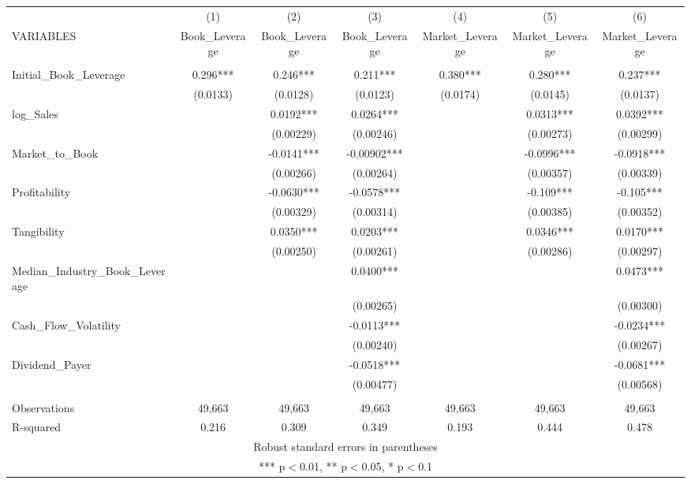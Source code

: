 \begin{tabular}{lcccccc} \hline
 & (1) & (2) & (3) & (4) & (5) & (6) \\
VARIABLES & Book\_Leverage & Book\_Leverage & Book\_Leverage & Market\_Leverage & Market\_Leverage & Market\_Leverage \\ \hline
 &  &  &  &  &  &  \\
Initial\_Book\_Leverage & 0.296*** & 0.246*** & 0.211*** & 0.380*** & 0.280*** & 0.237*** \\
 & (0.0133) & (0.0128) & (0.0123) & (0.0174) & (0.0145) & (0.0137) \\
log\_Sales &  & 0.0192*** & 0.0264*** &  & 0.0313*** & 0.0392*** \\
 &  & (0.00229) & (0.00246) &  & (0.00273) & (0.00299) \\
Market\_to\_Book &  & -0.0141*** & -0.00902*** &  & -0.0996*** & -0.0918*** \\
 &  & (0.00266) & (0.00264) &  & (0.00357) & (0.00339) \\
Profitability &  & -0.0630*** & -0.0578*** &  & -0.109*** & -0.105*** \\
 &  & (0.00329) & (0.00314) &  & (0.00385) & (0.00352) \\
Tangibility &  & 0.0350*** & 0.0203*** &  & 0.0346*** & 0.0170*** \\
 &  & (0.00250) & (0.00261) &  & (0.00286) & (0.00297) \\
Median\_Industry\_Book\_Leverage &  &  & 0.0400*** &  &  & 0.0473*** \\
 &  &  & (0.00265) &  &  & (0.00300) \\
Cash\_Flow\_Volatility &  &  & -0.0113*** &  &  & -0.0234*** \\
 &  &  & (0.00240) &  &  & (0.00267) \\
Dividend\_Payer &  &  & -0.0518*** &  &  & -0.0681*** \\
 &  &  & (0.00477) &  &  & (0.00568) \\
 &  &  &  &  &  &  \\
Observations & 49,663 & 49,663 & 49,663 & 49,663 & 49,663 & 49,663 \\
 R-squared & 0.216 & 0.309 & 0.349 & 0.193 & 0.444 & 0.478 \\ \hline
\multicolumn{7}{c}{ Robust standard errors in parentheses} \\
\multicolumn{7}{c}{ *** p$<$0.01, ** p$<$0.05, * p$<$0.1} \\
\end{tabular}
